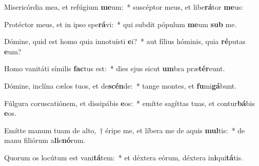 \item Misericórdia mea, et refúgium \textbf{me}um:~* suscéptor meus, et libe\textbf{rá}tor \textbf{me}us:
\item Protéctor meus, et in ipso spe\textbf{rá}vi:~* qui subdit pópulum \textbf{me}um \textbf{sub} me.
\item Dómine, quid est homo quia innotuísti \textbf{e}i?~* aut fílius hóminis, quia \textbf{ré}putas \textbf{e}um?
\item Homo vanitáti símilis \textbf{fac}tus est:~* dies ejus sicut \textbf{um}bra præ\textbf{tér}eunt.
\item Dómine, inclína cælos tuos, et de\textbf{scén}de:~* tange montes, et \textbf{fu}mi\textbf{gá}bunt.
\item Fúlgura coruscatiónem, et dissipábis \textbf{e}os:~* emítte sagíttas tuas, et contur\textbf{bá}bis \textbf{e}os.
\item Emítte manum tuam de alto,~† éripe me, et líbera me de aquis \textbf{mul}tis:~* de manu filiórum a\textbf{li}e\textbf{nó}rum.
\item Quorum os locútum est vani\textbf{tá}tem:~* et déxtera eórum, déxtera in\textbf{i}qui\textbf{tá}tis.
